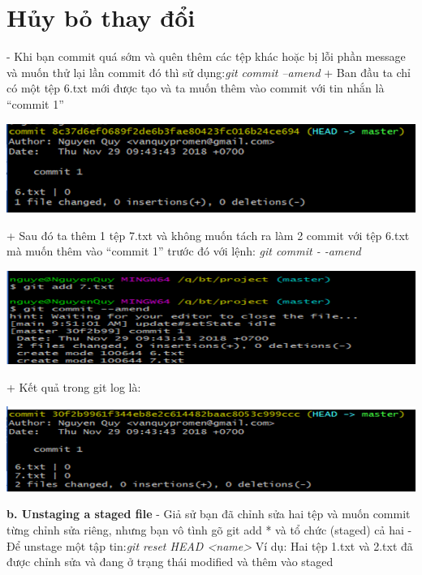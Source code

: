 \documentclass[12pt,a4paper]{report}
\begin{document}
	\label{fig:screenshot025}




	
\section{Hủy bỏ thay đổi}
\hspace{0.6cm}{\bf a. Undoing thing} \vskip 0.4cm
- Khi bạn commit quá sớm và quên thêm các tệp khác hoặc bị lỗi phần message và muốn thử lại lần commit đó thì sử dụng:{\it git commit –amend}\vskip 0.4cm
+ Ban đầu ta chỉ có một tệp 6.txt mới được tạo và ta muốn thêm vào commit với tin nhắn là “commit 1”\vskip 0.4cm

	\includegraphics[width=0.8\linewidth]{screenshot026}

	\label{fig:screenshot026}
\vskip 0.4cm\vskip 0.4cm
+ Sau đó ta thêm 1 tệp 7.txt và không muốn tách ra làm 2 commit với tệp 6.txt mà muốn thêm vào “commit 1” trước đó với lệnh: {\it git commit - -amend}\vskip 0.4cm

	\includegraphics[width=0.8\linewidth]{screenshot027}

	\label{fig:screenshot027}
\vskip 0.4cm\vskip 0.4cm
+ Kết quả trong git log là:\vskip 0.4cm

	\includegraphics[width=0.8\linewidth]{screenshot028}
	
	\label{fig:screenshot028}
\vskip 0.4cm\vskip 0.4cm

{\bf b. Unstaging a staged file}\vskip 0.4cm
- Giả sử bạn đã chỉnh sửa hai tệp và muốn commit từng chỉnh sửa riêng, nhưng bạn vô tình gõ git add * và tổ chức (staged) cả hai\vskip 0.4cm
- Để unstage một tập tin:{\it git reset HEAD <name>}\vskip 0.4cm
Ví dụ: Hai tệp 1.txt và 2.txt đã được chỉnh sửa và đang ở trạng thái modified và thêm vào staged\vskip 0.4cm
\end{document}
